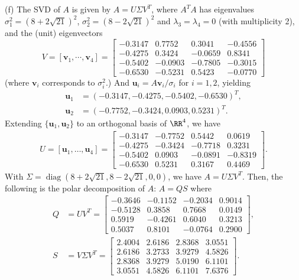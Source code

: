 \documentclass{homework}
\begin{document}
{\noindent(f) The SVD of $A$ is given by $A=U\Sigma V^T$, where $A^TA$ has eigenvalues $\sigma_1^2 = (8+ 2\sqrt{21})^2$, $\sigma_2^2 = (8-2\sqrt{21})^2$ and $\lambda_3=\lambda_4=0$ (with multiplicity 2), and the (unit) eigenvectors
$$ V = [\mathbf v_1,\cdots,\mathbf v_4] = \begin{bmatrix}
        -0.3147 & 0.7752  & 0.3041  & -0.4556 \\
        -0.4275 & 0.3424  & -0.0659 & 0.8341  \\
        -0.5402 & -0.0903 & -0.7805 & -0.3015 \\
        -0.6530 & -0.5231 & 0.5423  & -0.0770
    \end{bmatrix} $$
(where $\mathbf v_i$ corresponds to $\sigma_i^2$.) And $\mathbf u_i = A\mathbf v_i/\sigma_i$ for $i=1,2$, yielding
\begin{align*}
    \mathbf u_1 & = (-0.3147, -0.4275, -0.5402, -0.6530)^T, \\\mathbf u_2 &= (-0.7752,-0.3424,0.0903,0.5231)^T.
\end{align*}
Extending $\{\mathbf u_1, \mathbf u_2\}$ to an orthogonal basis of $\RR^4$, we have
\begin{align*}
    U = [\mathbf u_1,\dots,\mathbf u_4] = \begin{bmatrix}
        -0.3147 & -0.7752 & 0.5442  & 0.0619  \\
        -0.4275 & -0.3424 & -0.7718 & 0.3231  \\
        -0.5402 & 0.0903  & -0.0891 & -0.8319 \\
        -0.6530 & 0.5231  & 0.3167  & 0.4469
    \end{bmatrix}.
\end{align*}
With $\Sigma = \operatorname{diag}(8+ 2\sqrt{21}, 8- 2\sqrt{21},0,0)$, we have $A = U\Sigma V^T$. Then, the following is the polar decomposition of $A$: $A=QS$ where
\begin{align*}
    Q & = UV^T = \begin{bmatrix}
        -0.3646 & -0.1152 & -0.2034 & 0.9014 \\
        -0.5128 & 0.3858  & 0.7668  & 0.0149 \\
        0.5919  & -0.4261 & 0.6040  & 0.3213 \\
        0.5037  & 0.8101  & -0.0764 & 0.2900
    \end{bmatrix},        \\
    S & = V\Sigma V^T = \begin{bmatrix}
        2.4004 & 2.6186 & 2.8368 & 3.0551 \\
        2.6186 & 3.2733 & 3.9279 & 4.5826 \\
        2.8368 & 3.9279 & 5.0190 & 6.1101 \\
        3.0551 & 4.5826 & 6.1101 & 7.6376
    \end{bmatrix}.
\end{align*}
}
\end{document}
